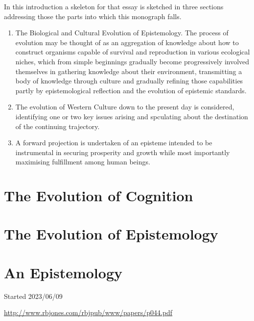 \documentclass[10pt,titlepage]{article}
\begin{document}
In this introduction a skeleton for that essay is sketched in three sections addressing those the parts into which this monograph falls.

\begin{enumerate}
\item The Biological and Cultural Evolution of Epistemology.
The process of evolution may be thought of as an aggregation of knowledge about how to construct organisms capable of survival and reproduction in various ecological niches, which from simple beginnings gradually become progressively involved themselves in gathering knowledge about their environment, transmitting a body of knowledge through culture and gradually refining those capabilities partly by epistemological reflection and the evolution of epistemic standards.
\item The evolution of Western Culture down to the present day is considered, identifying one or two key issues arising and spculating about the destination of the continuing trajectory.
\item A forward projection is undertaken of an episteme intended to be instrumental in securing prosperity and growth while most importantly maximising fulfillment among human beings. 
\end{enumerate}

\section{The Evolution of Cognition}

\section{The Evolution of Epistemology}

\section{An Epistemology}



{}





\tiny{
Started 2023/06/09


\href{http://www.rbjones.com/rbjpub/www/papers/p044.pdf}{http://www.rbjones.com/rbjpub/www/papers/p044.pdf}

}%
\end{document}
